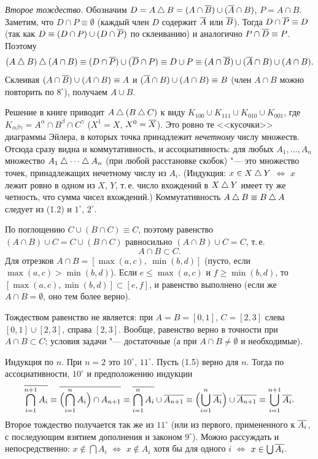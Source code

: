 \begin{solution}[1 (\S\,1)]
\emph{Второе тождество.} Обозначим $D=A\mathbin{\triangle} B=(A\cap\overline{B})\cup(\overline{A}\cap B)$,
$P=A\cap B$. Заметим, что $D\cap P\equiv\emptyset$ (каждый член $D$
содержит $\overline{A}$ или $\overline{B}$). Тогда $D\cap\overline{P}\equiv D$ (так как
$D\equiv(D\cap P)\cup(D\cap\overline{P})$ по склеиванию) и аналогично
$P\cap\overline{D}\equiv P$. Поэтому
\[
(A\mathbin{\triangle} B)\mathbin{\triangle}(A\cap B)\equiv(D\cap\overline{P})\cup(\overline{D}\cap P)\equiv D\cup P
\equiv(A\cap\overline{B})\cup(\overline{A}\cap B)\cup(A\cap B).
\]
Склеивая $(A\cap\overline{B})\cup(A\cap B)\equiv A$ и $(\overline{A}\cap B)\cup(A\cap B)\equiv B$
(член $A\cap B$ можно повторить по $8^\circ$), получаем $A\cup B$.
\end{solution}

\begin{solution}[2 (\S\,1): дополнение]
Решение в книге приводит $A\mathbin{\triangle}(B\mathbin{\triangle} C)$ к виду
$K_{100}\cup K_{111}\cup K_{010}\cup K_{001}$, где
$K_{\alpha\beta\gamma}=A^\alpha\cap B^\beta\cap C^\gamma$ ($X^1=X$,
$X^0=\overline{X}$). Это ровно те <<кусочки>> диаграммы Эйлера, в которых точка
принадлежит \emph{нечетному} числу множеств. Отсюда сразу видна и
коммутативность, и ассоциативность: для любых $A_1,\dots,A_n$ множество
$A_1\sd\dots\sd A_n$ (при любой расстановке скобок) "--- это множество
точек, принадлежащих нечетному числу из $A_i$. (Индукция: $x\in X\mathbin{\triangle} Y$
$\iff$ $x$ лежит ровно в одном из $X$, $Y$, т.\,е. число вхождений в $X\mathbin{\triangle} Y$
имеет ту же четность, что сумма чисел вхождений.) Коммутативность $A\mathbin{\triangle} B\equiv B\mathbin{\triangle} A$
следует из (1.2) и $1^\circ$, $2^\circ$.
\end{solution}

\begin{solution}[3 (\S\,1)]
По поглощению $C\cup(B\cap C)\equiv C$, поэтому равенство
$(A\cap B)\cup C=C\cup(B\cap C)$ равносильно $(A\cap B)\cup C=C$, т.\,е.
\[
A\cap B\subset C .
\]
Для отрезков $A\cap B=[\max(a,c),\ \min(b,d)]$ (пусто, если
$\max(a,c)>\min(b,d)$). Если $e\le\max(a,c)$ и $f\ge\min(b,d)$, то
$[\max(a,c),\min(b,d)]\subset[e,f]$, и равенство выполнено (если же
$A\cap B=\emptyset$, оно тем более верно).

Тождеством равенство не является: при $A=B=[0,1]$, $C=[2,3]$ слева
$[0,1]\cup[2,3]$, справа $[2,3]$. Вообще, равенство верно в точности при
$A\cap B\subset C$; условия задачи "--- достаточные (а при
$A\cap B\neq\emptyset$ и необходимые).
\end{solution}

\begin{solution}[4 (\S\,1)]
Индукция по $n$. При $n=2$ это $10^\circ$, $11^\circ$. Пусть (1.5) верно
для $n$. Тогда по ассоциативности, $10^\circ$ и предположению индукции
\[
\overline{\bigcap_{i=1}^{n+1}A_i}\equiv\overline{\Bigl(\bigcap_{i=1}^{n}A_i\Bigr)\cap A_{n+1}}
\equiv\overline{\bigcap_{i=1}^{n}A_i}\cup\overline{A_{n+1}}
\equiv\Bigl(\bigcup_{i=1}^{n}\overline{A_i}\Bigr)\cup\overline{A_{n+1}}\equiv\bigcup_{i=1}^{n+1}\overline{A_i}.
\]
Второе тождество получается так же из $11^\circ$ (или из первого,
примененного к $\overline{A_i}$, с последующим взятием дополнения и законом
$9^\circ$). Можно рассуждать и непосредственно: $x\notin\bigcap A_i$
$\iff$ $x\notin A_i$ хотя бы для одного $i$ $\iff$ $x\in\bigcup\overline{A_i}$.
\end{solution}
